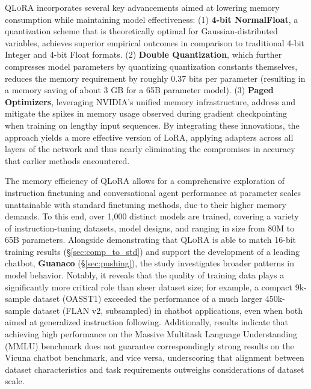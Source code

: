 \textsc{QLoRA} incorporates several key advancements aimed at lowering memory consumption while maintaining model effectiveness: (1) \textbf{4-bit NormalFloat}, a quantization scheme that is theoretically optimal for Gaussian-distributed variables, achieves superior empirical outcomes in comparison to traditional 4-bit Integer and 4-bit Float formats. (2) \textbf{Double Quantization}, which further compresses model parameters by quantizing quantization constants themselves, reduces the memory requirement by roughly 0.37 bits per parameter (resulting in a memory saving of about 3 GB for a 65B parameter model). (3) \textbf{Paged Optimizers}, leveraging NVIDIA's unified memory infrastructure, address and mitigate the spikes in memory usage observed during gradient checkpointing when training on lengthy input sequences. By integrating these innovations, the approach yields a more effective version of LoRA, applying adapters across all layers of the network and thus nearly eliminating the compromises in accuracy that earlier methods encountered.

The memory efficiency of \textsc{QLoRA} allows for a comprehensive exploration of instruction finetuning and conversational agent performance at parameter scales unattainable with standard finetuning methods, due to their higher memory demands. To this end, over 1,000 distinct models are trained, covering a variety of instruction-tuning datasets, model designs, and ranging in size from 80M to 65B parameters. Alongside demonstrating that \textsc{QLoRA} is able to match 16-bit training results (\S\ref{sec:comp_to_std}) and support the development of a leading chatbot, \textbf{Guanaco} (\S\ref{sec:pushing}), the study investigates broader patterns in model behavior. Notably, it reveals that the quality of training data plays a significantly more critical role than sheer dataset size; for example, a compact 9k-sample dataset (OASST1) exceeded the performance of a much larger 450k-sample dataset (FLAN v2, subsampled) in chatbot applications, even when both aimed at generalized instruction following. Additionally, results indicate that achieving high performance on the Massive Multitask Language Understanding (MMLU) benchmark does not guarantee correspondingly strong results on the Vicuna chatbot benchmark, and vice versa, underscoring that alignment between dataset characteristics and task requirements outweighs considerations of dataset scale.

